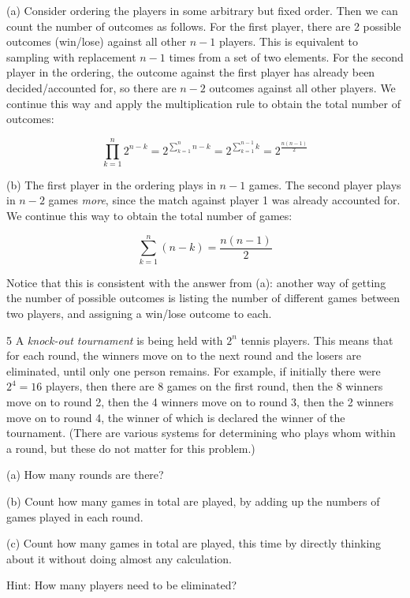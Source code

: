 \begin{solution}
    
    (a) Consider ordering the players in some arbitrary but fixed order.
    Then we can count the number of outcomes as follows.
    For the first player, there are 2 possible outcomes (win/lose) against all other $n - 1$ players.
    This is equivalent to sampling with replacement $n - 1$ times from a set of two elements.
    For the second player in the ordering, the outcome against the first player has already been decided/accounted for, so there are $n - 2$ outcomes against all other players.
    We continue this way and apply the multiplication rule to obtain the total number of outcomes:

    \[\prod_{k=1}^{n}2^{n-k} = 2^{\sum_{k=1}^{n}n - k} = 2^{\sum_{k=1}^{n - 1}k} = 2^{\frac{n(n-1)}{2}}\]

    (b) The first player in the ordering plays in $n - 1$ games.
    The second player plays in $n - 2$ games \textit{more}, since the match against player 1 was already accounted for.
    We continue this way to obtain the total number of games:

    \[\sum_{k=1}^{n} (n - k) = \frac{n(n - 1)}{2}\]

    Notice that this is consistent with the answer from (a): another way of getting the number of possible outcomes is listing the number of different games between two players, and assigning a win/lose outcome to each.
\end{solution}

\begin{exercise}{5}
    A \textit{knock-out tournament}  is being held with $2^n$ tennis players.
    This means that for each round, the winners move on to the next round and the losers are eliminated, until only one person remains.
    For example, if initially there were $2^4 = 16$ players, then there are 8 games on the first round, then the 8 winners move on to round 2, then the 4 winners move on to round 3, then the 2 winners move on to round 4, the winner of which is declared the winner of the tournament. (There are various systems for determining who plays whom within a round, but these do not matter for this problem.)

    (a) How many rounds are there?

    (b) Count how many games in total are played, by adding up the numbers of games played in each round.

    (c) Count how many games in total are played, this time by directly thinking about it without doing almost any calculation.

    Hint: How many players need to be eliminated?
\end{exercise}

